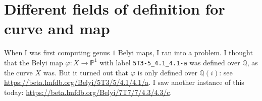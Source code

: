 \documentclass[reqno, 12pt]{amsart}
\theoremstyle{definition}
\theoremstyle{remark}
\newcommand{\Q}{\mathbb Q}
\renewcommand{\P}{\mathbb P}
\begin{document}
\section{Different fields of definition for curve and map}

When I was first computing genus $1$ Belyi maps, I ran into a problem. I thought that the Belyi map $\varphi: X \to \P^1$ with label \texttt{5T3-5\_4.1\_4.1-a} was defined over $\Q$, as the curve $X$ was. But it turned out that $\varphi$ is only defined over $\Q(i)$: see \url{https://beta.lmfdb.org/Belyi/5T3/5/4.1/4.1/a}. I saw another instance of this today: \url{https://beta.lmfdb.org/Belyi/7T7/7/4.3/4.3/c}.

%

%
\end{document}
